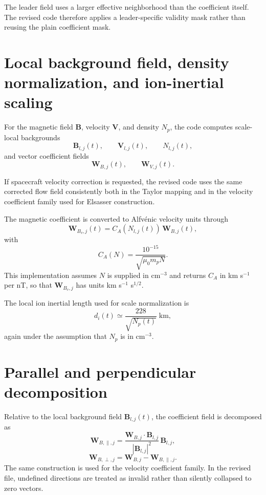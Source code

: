 \documentclass[11pt]{article}
\begin{document}
The leader field uses a larger effective neighborhood than the coefficient itself. The revised code therefore applies a leader-specific validity mask rather than reusing the plain coefficient mask.

\section{Local background field, density normalization, and ion-inertial scaling}

For the magnetic field $\mathbf{B}$, velocity $\mathbf{V}$, and density $N_p$, the code computes scale-local backgrounds
\begin{equation}
 \mathbf{B}_{l,j}(t), \qquad \mathbf{V}_{l,j}(t), \qquad N_{l,j}(t),
\end{equation}
and vector coefficient fields
\begin{equation}
 \mathbf{W}_{B,j}(t), \qquad \mathbf{W}_{V,j}(t).
\end{equation}

If spacecraft velocity correction is requested, the revised code uses the same corrected flow field consistently both in the Taylor mapping and in the velocity coefficient family used for Elsasser construction.

The magnetic coefficient is converted to Alfv\'enic velocity units through
\begin{equation}
 \mathbf{W}_{B_v,j}(t) = C_A\!\left(N_{l,j}(t)\right) \, \mathbf{W}_{B,j}(t),
\end{equation}
with
\begin{equation}
 C_A(N) = \frac{10^{-15}}{\sqrt{\mu_0 m_p N}}.
\end{equation}
This implementation assumes $N$ is supplied in cm$^{-3}$ and returns $C_A$ in km s$^{-1}$ per nT, so that $\mathbf{W}_{B_v,j}$ has units km s$^{-1}$ s$^{1/2}$.

The local ion inertial length used for scale normalization is
\begin{equation}
 d_i(t) \simeq \frac{228}{\sqrt{N_p(t)}} \; \mathrm{km},
\end{equation}
again under the assumption that $N_p$ is in cm$^{-3}$.

\section{Parallel and perpendicular decomposition}

Relative to the local background field $\mathbf{B}_{l,j}(t)$, the coefficient field is decomposed as
\begin{equation}
 \mathbf{W}_{B,\parallel,j} = \frac{\mathbf{W}_{B,j} \cdot \mathbf{B}_{l,j}}{|\mathbf{B}_{l,j}|^2} \, \mathbf{B}_{l,j},
\end{equation}
\begin{equation}
 \mathbf{W}_{B,\perp,j} = \mathbf{W}_{B,j} - \mathbf{W}_{B,\parallel,j}.
\end{equation}
The same construction is used for the velocity coefficient family. In the revised file, undefined directions are treated as invalid rather than silently collapsed to zero vectors.
\end{document}
